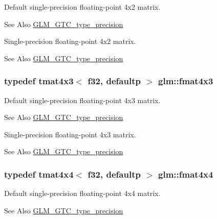 Default single-\/precision floating-\/point 4x2 matrix. \begin{DoxySeeAlso}{See Also}
\hyperlink{group__gtc__type__precision}{G\-L\-M\-\_\-\-G\-T\-C\-\_\-type\-\_\-precision}
\end{DoxySeeAlso}
Single-\/precision floating-\/point 4x2 matrix. \begin{DoxySeeAlso}{See Also}
\hyperlink{group__gtc__type__precision}{G\-L\-M\-\_\-\-G\-T\-C\-\_\-type\-\_\-precision} 
\end{DoxySeeAlso}
\hypertarget{group__gtc__type__precision_ga89195b7b13a41b0f1d34a962d1f66bfb}{
\subsubsection[{fmat4x3}]{\setlength{\rightskip}{0pt plus 5cm}typedef tmat4x3$<$ f32, defaultp $>$ {\bf glm\-::fmat4x3}}}\label{group__gtc__type__precision_ga89195b7b13a41b0f1d34a962d1f66bfb}
Default single-\/precision floating-\/point 4x3 matrix. \begin{DoxySeeAlso}{See Also}
\hyperlink{group__gtc__type__precision}{G\-L\-M\-\_\-\-G\-T\-C\-\_\-type\-\_\-precision}
\end{DoxySeeAlso}
Single-\/precision floating-\/point 4x3 matrix. \begin{DoxySeeAlso}{See Also}
\hyperlink{group__gtc__type__precision}{G\-L\-M\-\_\-\-G\-T\-C\-\_\-type\-\_\-precision} 
\end{DoxySeeAlso}
\hypertarget{group__gtc__type__precision_ga16b508b75c7213ba6b24055ff3b7503d}{
\subsubsection[{fmat4x4}]{\setlength{\rightskip}{0pt plus 5cm}typedef tmat4x4$<$ f32, defaultp $>$ {\bf glm\-::fmat4x4}}}\label{group__gtc__type__precision_ga16b508b75c7213ba6b24055ff3b7503d}
Default single-\/precision floating-\/point 4x4 matrix. \begin{DoxySeeAlso}{See Also}
\hyperlink{group__gtc__type__precision}{G\-L\-M\-\_\-\-G\-T\-C\-\_\-type\-\_\-precision}
\end{DoxySeeAlso}
